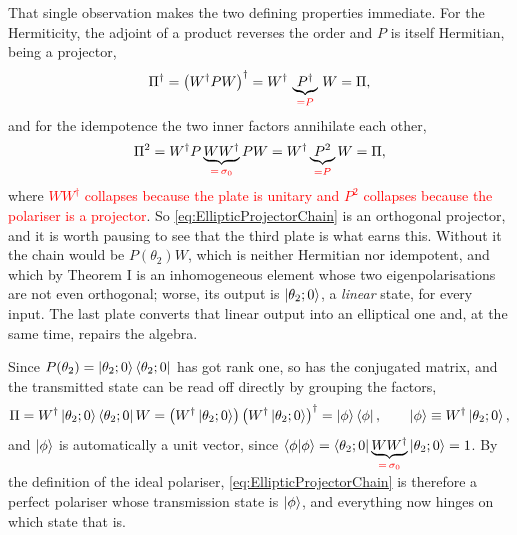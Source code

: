             That single observation makes the two defining properties immediate. For the Hermiticity, the adjoint of a product reverses the order and $P$ is itself Hermitian, being a projector,
            \begin{equation*}
                \Pi^{\dagger} = \left(W^{\dagger}PW\right)^{\dagger} = W^{\dagger}\,\underbrace{P^{\dagger}}_{\textcolor{red}{=P}}\,W = \Pi ,
            \end{equation*}
            and for the idempotence the two inner factors annihilate each other,
            \begin{equation*}
                \Pi^2 = W^{\dagger}P\underbrace{WW^{\dagger}}_{\textcolor{red}{=\,\sigma_0}}PW = W^{\dagger}\underbrace{P^2}_{\textcolor{red}{=P}}W = \Pi ,
            \end{equation*}
            where \textcolor{red}{$WW^{\dagger}$ collapses because the plate is unitary and $P^2$ collapses because the polariser is a projector}. So \ref{eq:EllipticProjectorChain} is an orthogonal projector, and it is worth pausing to see that the third plate is what earns this. Without it the chain would be $P(\theta_2)W$, which is neither Hermitian nor idempotent, and which by Theorem I is an inhomogeneous element whose two eigenpolarisations are not even orthogonal; worse, its output is $\ket{\theta_2;0}$, a \textit{linear} state, for every input. The last plate converts that linear output into an elliptical one and, at the same time, repairs the algebra.

            Since $P(\theta_2)=\ket{\theta_2;0}\bra{\theta_2;0}$ has got rank one, so has the conjugated matrix, and the transmitted state can be read off directly by grouping the factors,
            \begin{equation}\label{eq:EllipticProjectorRankOne}
                \Pi = W^{\dagger}\ket{\theta_2;0}\bra{\theta_2;0}W = \left(W^{\dagger}\ket{\theta_2;0}\right)\left(W^{\dagger}\ket{\theta_2;0}\right)^{\dagger} = \ket{\phi}\bra{\phi}, \qquad \ket{\phi}\equiv W^{\dagger}\ket{\theta_2;0},
            \end{equation}
            and $\ket{\phi}$ is automatically a unit vector, since $\braket{\phi|\phi}=\bra{\theta_2;0}\underbrace{WW^{\dagger}}_{\textcolor{red}{=\,\sigma_0}}\ket{\theta_2;0}=1$. By the definition of the ideal polariser, \ref{eq:EllipticProjectorChain} is therefore a perfect polariser whose transmission state is $\ket{\phi}$, and everything now hinges on which state that is.

